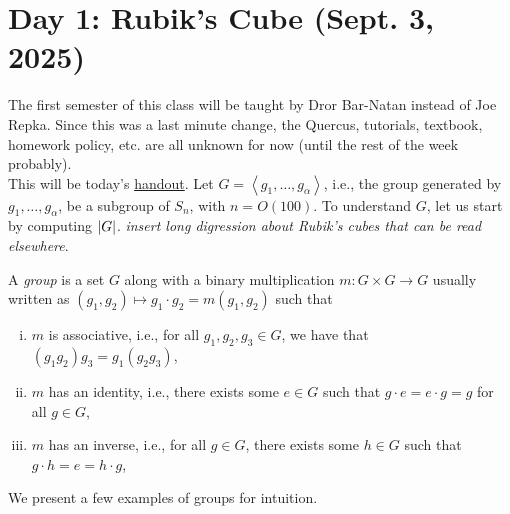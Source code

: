 \section{Day 1: Rubik's Cube (Sept. 3, 2025)}
The first semester of this class will be taught by Dror Bar-Natan instead of Joe Repka. Since this was a last minute change, the Quercus, tutorials, textbook, homework policy, etc. are all unknown for now (until the rest of the week probably).
\\[8pt]
This will be today's \href{https://www.math.toronto.edu/~drorbn/Talks/Cambridge-1301/}{handout}. Let $G = \left<g_1, \dots, g_\alpha\right>$, i.e., the group generated by $g_1, \dots, g_\alpha$, be a subgroup of $S_n$, with $n = O(100)$. To understand $G$, let us start by computing $\left\lvert G \right\rvert$. \textit{insert long digression about Rubik's cubes that can be read elsewhere}.
\begin{definition}
    A \textit{group} is a set $G$ along with a binary multiplication $m : G \times G \to G$ usually written as $(g_1, g_2) \mapsto g_1 \cdot g_2 = m(g_1, g_2)$ such that
    \begin{enumerate}[(i)]
        \item $m$ is associative, i.e., for all $g_1, g_2, g_3 \in G$, we have that $(g_1 g_2) g_3 = g_1 (g_2 g_3)$,
        \item $m$ has an identity, i.e., there exists some $e \in G$ such that $g \cdot e = e \cdot g = g$ for all $g \in G$,
        \item $m$ has an inverse, i.e., for all $g \in G$, there exists some $h \in G$ such that $g \cdot h = e = h \cdot g$,
    \end{enumerate}
\end{definition}
\noindent We present a few examples of groups for intuition.
